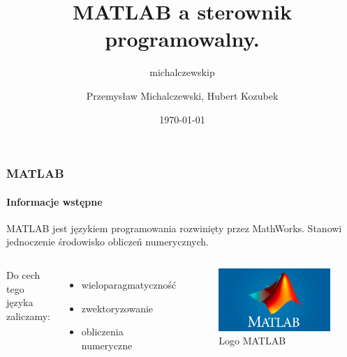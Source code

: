 \documentclass[aspectratio=169]{beamer}
\author{michalczewskip}
\title[PUST]{MATLAB a sterownik programowalny.
}
\author{Przemysław Michalczewski, Hubert Kozubek}
\date{\today}
\begin{document}
\begin{frame}[plain]
\maketitle
\end{frame}





\begin{frame}
\frametitle{MATLAB}
\framesubtitle{Informacje wstępne}

 MATLAB jest językiem programowania rozwinięty przez MathWorks. Stanowi jednoczenie środowisko obliczeń numerycznych.
\newline
\begin{columns} 

Do cech tego języka zaliczamy:

\begin{itemize}
  \item wieloparagmatyczność
  \item zwektoryzowanie
  \item obliczenia numeryczne
\end{itemize}
\begin{figure}%
\includegraphics[width=\linewidth]{Rysunki/MATLAB-Symbol.jpg}%
\caption{Logo MATLAB}%
\label{logo_matlab}%
\end{figure}

\end{columns}

\end{frame}
\end{document}
